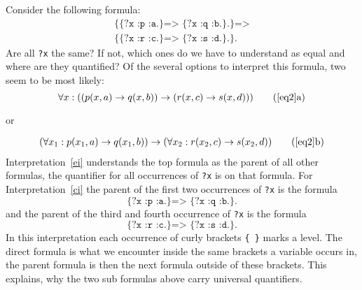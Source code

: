Consider the following formula:
\begin{multline}
\texttt{\{\{?x :p :a.\} => \{?x :q :b.\}.\} =>}\\
\texttt{\{\{?x :r :c.\} => \{?x :s :d.\}.\}.} \label{eq2} \end{multline}
Are all \verb!?x! the same? If not, which ones do we have to understand as equal and where are they quantified? 
Of the several options to interpret this formula, two seem to be most likely:
\[\forall x: ((p(x,a)\rightarrow q(x,b))\rightarrow ( r(x,c) \rightarrow s(x,d)))\tag{\ref{eq2}a}\label{ei}\]
\begin{center}or\end{center}
\vspace{-\baselineskip}
\begin{multline}
(\forall x_1: p(x_1,a)\rightarrow q(x_1,b))\rightarrow (\forall x_2: r(x_2,c) \rightarrow s(x_2,d))\tag{\ref{eq2}b}\label{ci}
\end{multline}
Interpretation~\ref{ei} understands the top formula as the parent of all other formulas, the quantifier for all occurrences of \texttt{?x} is on that formula.
For Interpretation~\ref{ci} the parent of the first two occurrences of \texttt{?x} is the formula 
\begin{equation}
\texttt{\{?x :p :a.\} => \{?x :q :b.\}.}\label{sub1}
\end{equation}
and the parent of the third and fourth occurrence of \texttt{?x} is the formula
\begin{equation}\texttt{\{?x :r :c.\} => \{?x :s :d.\}.}\label{sub2}\end{equation}
In this interpretation each occurrence of curly brackets \texttt{\{ \}} marks a level. The direct formula is what 
we encounter inside the same brackets a variable occurs in, the parent formula is then the next formula 
outside of these brackets. This explains, why the two sub formulas above carry universal quantifiers.

